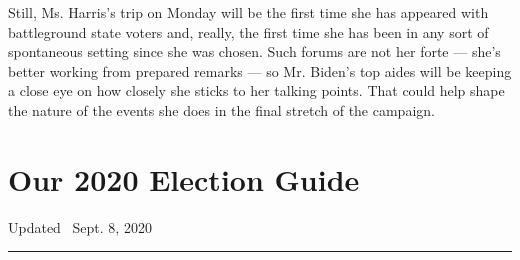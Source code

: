 Still, Ms. Harris's trip on Monday will be the first time she has
appeared with battleground state voters and, really, the first time she
has been in any sort of spontaneous setting since she was chosen. Such
forums are not her forte --- she's better working from prepared remarks
--- so Mr. Biden's top aides will be keeping a close eye on how closely
she sticks to her talking points. That could help shape the nature of
the events she does in the final stretch of the campaign.

\hypertarget{our-2020-election-guide}{%
\section{Our 2020 Election Guide}\label{our-2020-election-guide}}

Updated ~Sept. 8, 2020

\begin{center}\rule{0.5\linewidth}{\linethickness}\end{center}

